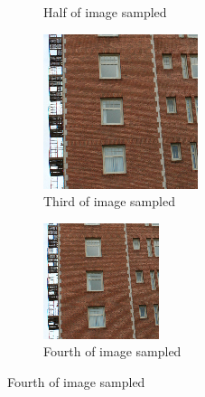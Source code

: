 \documentclass{article}
\begin{document}
\begin{figure}[h]
\begin{subfigure}[t]{0.49\textwidth}
		\caption{Half of image sampled}
		\label{fig:aliasbrick2.png}
	\end{subfigure}
	\begin{subfigure}[b]{0.49\textwidth}
		\includegraphics[width = \textwidth]{aliasbrick3.png}
		\caption{Third of image sampled}
		\label{fig:aliasbrick3.png}
	\end{subfigure}
	\begin{subfigure}[b]{0.49\textwidth}
		\includegraphics[width = \textwidth]{aliasbrick4.png}
		\caption{Fourth of  image sampled}
		\label{fig:aliasbrick4.png}
	\end{subfigure}
\end{figure}
\end{document}
